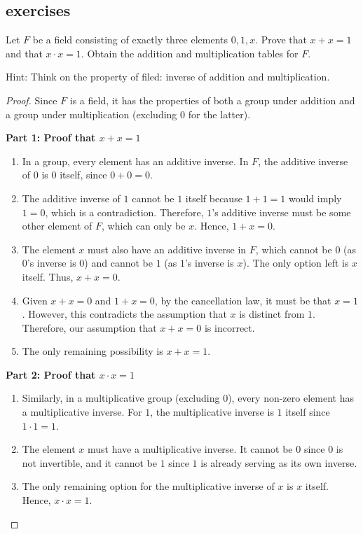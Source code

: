 \documentclass[
	12pt, %
	fleqn, %
	a4paper, %
]{LegrandOrangeBook}
\begin{document}
\subsection{exercises}
\begin{exercise}
    
        Let \( F \) be a field consisting of exactly three elements \( 0, 1, x \). Prove that \( x + x = 1 \) and that \( x \cdot x = 1 \). Obtain the addition and multiplication tables for \( F \).
        
\end{exercise}
    Hint: Think on the property of filed: inverse of addition and multiplication.
    \begin{proof}
        Since \( F \) is a field, it has the properties of both a group under addition and a group under multiplication (excluding \( 0 \) for the latter).
        
        \textbf{Part 1: Proof that \( x + x = 1 \)}
        \begin{enumerate}
            \item In a group, every element has an additive inverse. In \( F \), the additive inverse of \( 0 \) is \( 0 \) itself, since \( 0 + 0 = 0 \).
            \item The additive inverse of \( 1 \) cannot be \( 1 \) itself because \( 1 + 1 = 1 \) would imply \( 1 = 0 \), which is a contradiction. Therefore, \( 1 \)'s additive inverse must be some other element of \( F \), which can only be \( x \). Hence, \( 1 + x = 0 \).
            \item The element \( x \) must also have an additive inverse in \( F \), which cannot be \( 0 \) (as \( 0 \)'s inverse is \( 0 \)) and cannot be \( 1 \) (as \( 1 \)'s inverse is \( x \)). The only option left is \( x \) itself. Thus, \( x + x = 0 \).
            \item Given \( x + x = 0 \) and \( 1 + x = 0 \), by the cancellation law, it must be that \( x = 1 \). However, this contradicts the assumption that \( x \) is distinct from \( 1 \). Therefore, our assumption that \( x + x = 0 \) is incorrect.
            \item The only remaining possibility is \( x + x = 1 \).
        \end{enumerate}
        
        \textbf{Part 2: Proof that \( x \cdot x = 1 \)}
        \begin{enumerate}
            \item Similarly, in a multiplicative group (excluding \( 0 \)), every non-zero element has a multiplicative inverse. For \( 1 \), the multiplicative inverse is \( 1 \) itself since \( 1 \cdot 1 = 1 \).
            \item The element \( x \) must have a multiplicative inverse. It cannot be \( 0 \) since \( 0 \) is not invertible, and it cannot be \( 1 \) since \( 1 \) is already serving as its own inverse.
            \item The only remaining option for the multiplicative inverse of \( x \) is \( x \) itself. Hence, \( x \cdot x = 1 \).
        \end{enumerate}


\end{proof}
\end{document}
